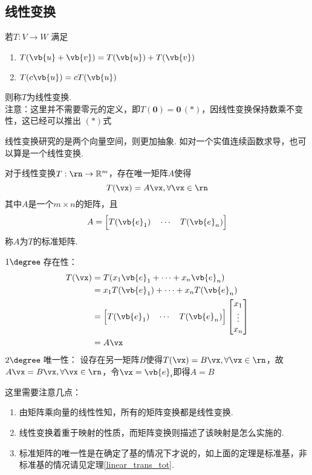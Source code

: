 \subsection{线性变换}
\begin{definition}
若$T:V\to W$ 满足
\begin{enumerate}
	\item $T(\vb{u}+\vb{v})=T(\vb{u})+T(\vb{v})$
	\item $T(c\vb{u})=cT(\vb{u})$
\end{enumerate}
则称$T$为线性变换.\\
注意：这里并不需要零元的定义，即$T(\mathbf{0})=\mathbf{0}\,(*)$，因线性变换保持数乘不变性，这已经可以推出 $(*)$式
\end{definition}
\par 线性变换研究的是两个向量空间，则更加抽象. 如对一个实值连续函数求导，也可以算是一个线性变换.
\begin{theorem}[标准(standard)矩阵]
对于线性变换$T:\rn\to\mathbb{R}^m$，存在唯一矩阵$A$使得
\[T(\vx)=A\vx,\forall\vx\in\rn\]
其中$A$是一个$m\times n$的矩阵，且
\[A=\Big[T(\vb{e}_1)\quad\cdots\quad T(\vb{e}_n)\Big]\]
称$A$为$T$的标准矩阵.
\end{theorem}
\begin{analysis}
$1\degree\;$存在性：
\[\begin{aligned}T(\vx) &= T(x_1\vb{e}_1+\cdots+x_n\vb{e}_n)\\
&= x_1T(\vb{e}_1)+\cdots+x_nT(\vb{e}_n)\\
&= \Big[T(\vb{e}_1)\quad\cdots\quad T(\vb{e}_n)\Big]\begin{bmatrix}x_1\\\vdots\\x_n\end{bmatrix}\\
&= A\vx
\end{aligned}\]
$2\degree\;$唯一性：
设存在另一矩阵$B$使得$T(\vx)=B\vx,\forall\vx\in\rn$，故$A\vx=B\vx,\forall\vx\in\rn$，令$\vx=\vb{e}_i$即得$A=B$
\end{analysis}
这里需要注意几点：
\begin{enumerate}
	\item 由矩阵乘向量的线性性知，所有的矩阵变换都是线性变换.
	\item 线性变换着重于映射的性质，而矩阵变换则描述了该映射是怎么实施的.
	\item 标准矩阵的唯一性是在确定了基的情况下才说的，如上面的定理是标准基，非标准基的情况请见定理\ref{linear_trans_tot}.
\end{enumerate}
